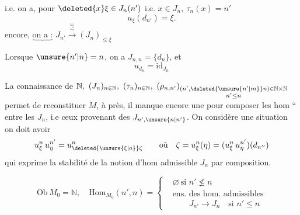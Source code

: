 i.e. on a, pour \(\deleted{x}\xi\in J_n(n')\) i.e. \(x\in J_n,\ \tau_n(x)=n'\)
\[
 u_\xi(d_{n'})=\xi .
\]
   encore, \(\underbrace{\text{on a :}}\)  \(J_{n'}\xrightarrow{\overset{u_\xi}{\sim}}(J_n)_{\leq\xi}\)

Lorsque \(\unsure{n'|n}=n\), on a \(J_{n,n}=\{d_n\}\), et
\[
 u_{d_n}=\mathrm{id}_{J_n}
\]

La connaissance de \(\mathbb N,\ (J_n)_{n\in\mathbb N},\ (\tau_n)_{n\in\mathbb N},\
(\rho_{n,n'})_{\substack{(n',\deleted{\unsure{n'|m}}n)\in\mathbb N\times\mathbb N\\ n'\leq n}}\) permet de reconstituer   \(M\), à   près, il manque encore une   pour composer les hom `` entre les \(J_n\), i.e ceux provenant des \(J_{n',\unsure{n|n'}}\).  On considère une situation
on doit avoir
\[
 u_\xi^n\,u_\eta^{n'}=u_{\deleted{\unsure{\xi|a}}\zeta}^{n}
 \qquad\text{où}\quad \zeta=u_\xi^n(\eta)=
 (u_\xi^n\,u_\eta^{n'})(d_{n''})
\]
qui exprime la  stabilité de la notion d'hom admissible  \(J_n\) par composition.

 
\[
 \mathrm{Ob}\,M_0=\mathbb N,\quad \mathrm{Hom}_{M_0}(n',n)=
 \left\{\begin{aligned}
 &\varnothing\ \text{si }n'\nleq n\\
 &\text{ens. des hom. admissibles}\\
 &\qquad J_{n'}\to J_n\quad\text{si }n'\leq n
 \end{aligned}\right.
\]

